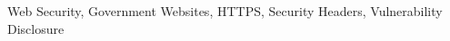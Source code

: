 \documentclass[conference]{IEEEtran}
\begin{document}
\begin{IEEEkeywords}
Web Security, Government Websites, HTTPS, Security Headers, Vulnerability Disclosure
\end{IEEEkeywords}



\end{document}
